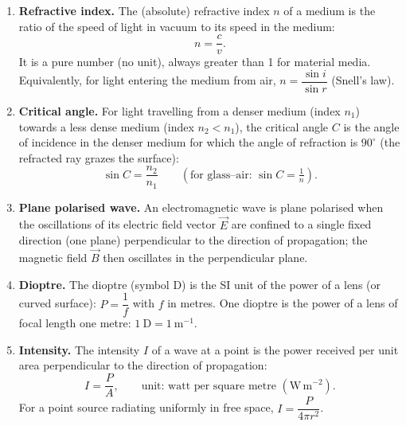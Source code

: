 \documentclass[11pt]{article}
\begin{document}
\begin{corrige}
\begin{enumerate}
\item \textbf{Refractive index.} The (absolute) refractive index $n$ of a medium is the ratio of the speed of light in vacuum to its speed in the medium:
\[ n = \frac{c}{v}. \]
It is a pure number (no unit), always greater than 1 for material media. Equivalently, for light entering the medium from air, $n = \dfrac{\sin i}{\sin r}$ (Snell's law).

\item \textbf{Critical angle.} For light travelling from a denser medium (index $n_{1}$) towards a less dense medium (index $n_{2}<n_{1}$), the critical angle $C$ is the angle of incidence in the denser medium for which the angle of refraction is $90^{\circ}$ (the refracted ray grazes the surface):
\[ \sin C = \frac{n_{2}}{n_{1}} \qquad (\text{for glass--air: } \sin C = \tfrac{1}{n}). \]

\item \textbf{Plane polarised wave.} An electromagnetic wave is plane polarised when the oscillations of its electric field vector $\vec{E}$ are confined to a single fixed direction (one plane) perpendicular to the direction of propagation; the magnetic field $\vec{B}$ then oscillates in the perpendicular plane.

\item \textbf{Dioptre.} The dioptre (symbol D) is the SI unit of the power of a lens (or curved surface): $P = \dfrac{1}{f}$ with $f$ in metres. One dioptre is the power of a lens of focal length one metre: $1\ \mathrm{D} = 1\ \mathrm{m^{-1}}$.

\item \textbf{Intensity.} The intensity $I$ of a wave at a point is the power received per unit area perpendicular to the direction of propagation:
\[ I = \frac{P}{A}, \qquad \text{unit: watt per square metre } (\mathrm{W\,m^{-2}}). \]
For a point source radiating uniformly in free space, $I = \dfrac{P}{4\pi r^{2}}$.
\end{enumerate}
\end{corrige}
\end{document}
